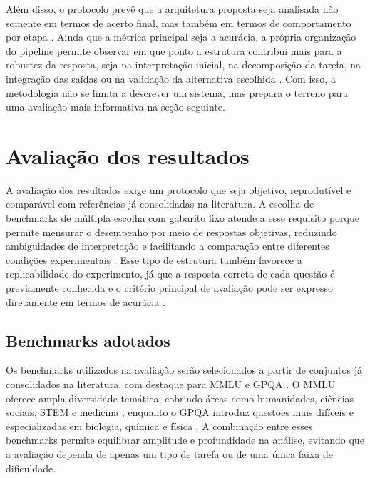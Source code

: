 \documentclass[a4paper,10pt,twocolumn]{article}
\begin{document}
Além disso, o protocolo prevê que a arquitetura proposta seja analisada não somente em termos de acerto final, mas também em termos de comportamento por etapa \cite{zheng2024judging,li2024llms_judges}. Ainda que a métrica principal seja a acurácia, a própria organização do pipeline permite observar em que ponto a estrutura contribui mais para a robustez da resposta, seja na interpretação inicial, na decomposição da tarefa, na integração das saídas ou na validação da alternativa escolhida \cite{shinn2023reflexion,wang2023selfconsistency}. Com isso, a metodologia não se limita a descrever um sistema, mas prepara o terreno para uma avaliação mais informativa na seção seguinte.
\FloatBarrier

\section{Avaliação dos resultados}

A avaliação dos resultados exige um protocolo que seja objetivo, reprodutível e comparável com referências já consolidadas na literatura. A escolha de benchmarks de múltipla escolha com gabarito fixo atende a esse requisito porque permite mensurar o desempenho por meio de respostas objetivas, reduzindo ambiguidades de interpretação e facilitando a comparação entre diferentes condições experimentais \cite{hendrycks2021measuring,rein2023gpqa}. Esse tipo de estrutura também favorece a replicabilidade do experimento, já que a resposta correta de cada questão é previamente conhecida e o critério principal de avaliação pode ser expresso diretamente em termos de acurácia \cite{zhang2024enhancing,liu2025beyond}.

\subsection{Benchmarks adotados}

Os benchmarks utilizados na avaliação serão selecionados a partir de conjuntos já consolidados na literatura, com destaque para MMLU e GPQA \cite{hendrycks2021measuring,rein2023gpqa}. O MMLU oferece ampla diversidade temática, cobrindo áreas como humanidades, ciências sociais, STEM e medicina \cite{hendrycks2021measuring}, enquanto o GPQA introduz questões mais difíceis e especializadas em biologia, química e física \cite{rein2023gpqa}. A combinação entre esses benchmarks permite equilibrar amplitude e profundidade na análise, evitando que a avaliação dependa de apenas um tipo de tarefa ou de uma única faixa de dificuldade.
\end{document}
